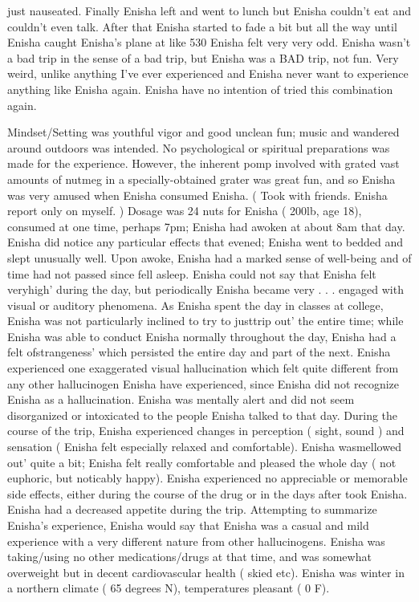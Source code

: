 \documentclass[12pt]{book}
\begin{document}
just nauseated. Finally Enisha left and went to lunch but Enisha couldn't eat and couldn't even talk. After that Enisha started to fade a bit but all the way until Enisha caught Enisha's plane at like 530 Enisha felt very very odd. Enisha wasn't a bad trip in the sense of a bad trip, but Enisha was a BAD trip, not fun. Very weird, unlike anything I've ever experienced and Enisha never want to experience anything like Enisha again. Enisha have no intention of tried this combination again.



Mindset/Setting was youthful vigor and good unclean fun; music and wandered around outdoors was intended. No psychological or spiritual preparations was made for the experience. However, the inherent pomp involved with grated vast amounts of nutmeg in a specially-obtained grater was great fun, and so Enisha was very amused when Enisha consumed Enisha. ( Took with friends. Enisha report only on myself. ) Dosage was 24 nuts for Enisha ( 200lb, age 18), consumed at one time, perhaps 7pm; Enisha had awoken at about 8am that day. Enisha did notice any particular effects that evened; Enisha went to bedded and slept unusually well. Upon awoke, Enisha had a marked sense of well-being and of time had not passed since fell asleep. Enisha could not say that Enisha felt veryhigh' during the day, but periodically Enisha became very . . .  engaged with visual or auditory phenomena. As Enisha spent the day in classes at college, Enisha was not particularly inclined to try to justtrip out' the entire time; while Enisha was able to conduct Enisha normally throughout the day, Enisha had a felt ofstrangeness' which persisted the entire day and part of the next. Enisha experienced one exaggerated visual hallucination which felt quite different from any other hallucinogen Enisha have experienced, since Enisha did not recognize Enisha as a hallucination. Enisha was mentally alert and did not seem disorganized or intoxicated to the people Enisha talked to that day. During the course of the trip, Enisha experienced changes in perception ( sight, sound ) and sensation ( Enisha felt especially relaxed and comfortable). Enisha wasmellowed out' quite a bit; Enisha felt really comfortable and pleased the whole day ( not euphoric, but noticably happy). Enisha experienced no appreciable or memorable side effects, either during the course of the drug or in the days after took Enisha. Enisha had a decreased appetite during the trip. Attempting to summarize Enisha's experience, Enisha would say that Enisha was a casual and mild experience with a very different nature from other hallucinogens. Enisha was taking/using no other medications/drugs at that time, and was somewhat overweight but in decent cardiovascular health ( skied etc). Enisha was winter in a northern climate ( 65 degrees N), temperatures pleasant ( 0 F).
\end{document}
